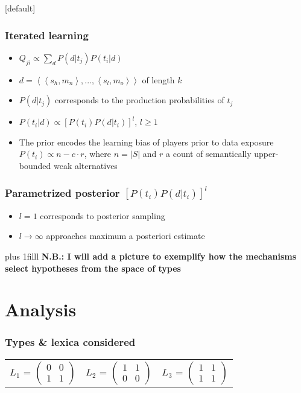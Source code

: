 \documentclass{beamer} %
\makeatletter
\newcommand{\vFill}{\vskip0pt plus 1filll}
\newcommand{\tuple}[1]{\ensuremath{\left\langle #1 \right\rangle}}
\newenvironment{withoutheadline}{
        \setbeamertemplate{headline}[default]
        \def\beamer@entrycode{\vspace*{-\headheight}}
    }{}
\makeatother
\begin{document}
\begin{withoutheadline}
\begin{frame}
	\frametitle{Iterated learning}
\begin{itemize} \itemsep1em
		\item $Q_{ji} \propto \sum_d P(d|t_j)P(t_i|d)$
		\item $d = \tuple{\tuple{s_h,m_n}, ..., \tuple{s_l,m_o}}$ of length $k$
		\item $P(d|t_j)$ corresponds to the production probabilities of $t_j$
		\item $P(t_i|d) \propto [P(t_i)P(d|t_i)]^l$, $l \geq 1$
		\item The prior encodes the learning bias of players prior to data exposure\\[0,3cm]
		      $P(t_i) \propto n - c \cdot r$, where $n = |S|$ and $r$ a count of semantically upper-bounded weak alternatives
\end{itemize}
\end{frame}

\begin{frame}
	\frametitle{Parametrized posterior $[P(t_i)P(d|t_i)]^l$}
\begin{itemize}\itemsep2em
	  \item $l = 1$ corresponds to posterior sampling
	  \item $l \to \infty$ approaches maximum a posteriori estimate 
	\end{itemize}
\vFill
{\bf N.B.: I will add a picture to exemplify how the mechanisms select hypotheses from the space of types}
\end{frame}


\section{Analysis}



\begin{frame}
	\frametitle{Types \& lexica considered}
\begin{table}
\centering 
\begin{tabular}{l c l}
$L_1$ = $\begin{pmatrix} 0 & 0 \\ 1 & 1 \end{pmatrix}$ & 
$L_2$ = $\begin{pmatrix} 1 & 1 \\ 0 & 0 \end{pmatrix}$ & 
$L_3$ = $\begin{pmatrix} 1 & 1 \\ 1 & 1 \end{pmatrix}$\\[0.5cm]


\end{tabular}
\end{table}
\end{frame}
\end{withoutheadline}
\end{document}
